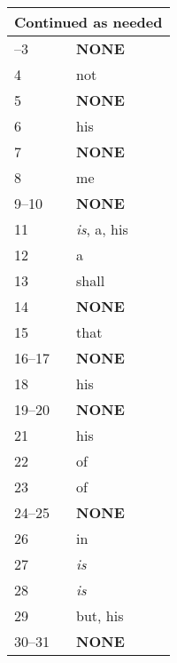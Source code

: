 \begin{center}
\begin{longtable}{p{0.4in}|p{1.5in}|p{2.6in}}
\hline \multicolumn{3}{|r|}{{Continued as needed}} \\ \hline
\endfoot 
1--3 & \textbf{\textcolor[rgb]{0.00,1.00,0.00}{NONE}}  &\\ \hline
4 & not & \\ \hline
5 & \textbf{\textcolor[rgb]{0.00,1.00,0.00}{NONE}} & \\ \hline
6 & his & \\ \hline
7 & \textbf{\textcolor[rgb]{0.00,1.00,0.00}{NONE}} & \\ \hline
8 & me & \\ \hline
9--10 & \textbf{\textcolor[rgb]{0.00,1.00,0.00}{NONE}} & \\ \hline
11 & \emph{is}, a, his & \\ \hline
12 & a & \\ \hline
13 & shall & \\ \hline
14 & \textbf{\textcolor[rgb]{0.00,1.00,0.00}{NONE}} & \\ \hline
15 & that & \\ \hline
16--17 & \textbf{\textcolor[rgb]{0.00,1.00,0.00}{NONE}} & \\ \hline
18 & his & \\ \hline
19--20 & \textbf{\textcolor[rgb]{0.00,1.00,0.00}{NONE}} & \\ \hline
21 & his & \\ \hline
22 & of & \\ \hline
23 & of & \\ \hline
24--25 & \textbf{\textcolor[rgb]{0.00,1.00,0.00}{NONE}} & \\ \hline
26 & in & \\ \hline
27 & \emph{is} &\\ \hline
28 & \emph{is} & \\ \hline
29 & but, his \\ \hline
30--31 & \textbf{\textcolor[rgb]{0.00,1.00,0.00}{NONE}} & \\ \hline
\hline \hline



\end{longtable}
\end{center}


